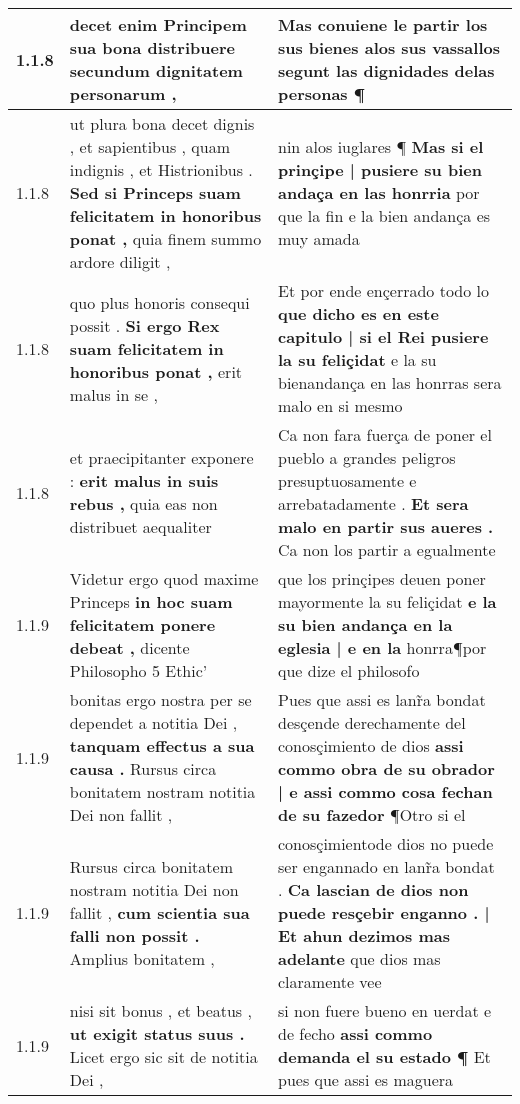 \begin{tabular}{|p{1cm}|p{6.5cm}|p{6.5cm}|}
1.1.8 & decet enim Principem \textbf{ sua bona distribuere } secundum dignitatem personarum , & Mas conuiene le partir los sus bienes \textbf{ alos sus vassallos } segunt las dignidades delas personas ¶ \\\hline
1.1.8 & ut plura bona decet dignis , et sapientibus , quam indignis , et Histrionibus . \textbf{ Sed si Princeps suam felicitatem in honoribus ponat , } quia finem summo ardore diligit , & nin alos iuglares ¶ \textbf{ Mas si el prinçipe | pusiere su bien andaça en las honrria } por que la fin e la bien andança es muy amada \\\hline
1.1.8 & quo plus honoris consequi possit . \textbf{ Si ergo Rex suam felicitatem in honoribus ponat , } erit malus in se , & Et por ende ençerrado todo lo \textbf{ que dicho es en este capitulo | si el Rei pusiere la su feliçidat } e la su bienandança en las honrras sera malo en si mesmo \\\hline
1.1.8 & et praecipitanter exponere : \textbf{ erit malus in suis rebus , } quia eas non distribuet aequaliter & Ca non fara fuerça de poner el pueblo a grandes peligros presuptuosamente e arrebatadamente . \textbf{ Et sera malo en partir sus aueres . } Ca non los partir a egualmente \\\hline
1.1.9 & Videtur ergo quod maxime Princeps \textbf{ in hoc suam felicitatem ponere debeat , } dicente Philosopho 5 Ethic’ & que los prinçipes deuen poner mayormente la su feliçidat \textbf{ e la su bien andança en la eglesia | e en la } honrra¶por que dize el philosofo \\\hline
1.1.9 & bonitas ergo nostra per se dependet a notitia Dei , \textbf{ tanquam effectus a sua causa . } Rursus circa bonitatem nostram notitia Dei non fallit , & Pues que assi es lanr̃a bondat desçende derechamente del conosçimiento de dios \textbf{ assi commo obra de su obrador | e assi commo cosa fechan de su fazedor } ¶Otro si el \\\hline
1.1.9 & Rursus circa bonitatem nostram notitia Dei non fallit , \textbf{ cum scientia sua falli non possit . } Amplius bonitatem , & conosçimientode dios no puede ser engannado en lanr̃a bondat . \textbf{ Ca lascian de dios non puede resçebir enganno . | Et ahun dezimos mas adelante } que dios mas claramente vee \\\hline
1.1.9 & nisi sit bonus , et beatus , \textbf{ ut exigit status suus . } Licet ergo sic sit de notitia Dei , & si non fuere bueno en uerdat e de fecho \textbf{ assi commo demanda el su estado ¶ } Et pues que assi es maguera \\\hline

\end{tabular}
